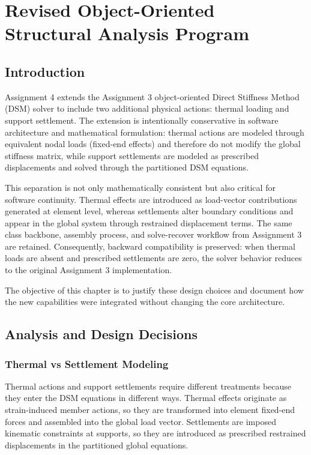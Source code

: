 \chapter{Revised Object-Oriented Structural Analysis Program}

\section{Introduction}
Assignment 4 extends the Assignment 3 object-oriented Direct Stiffness Method (DSM) solver to include two additional physical actions: thermal loading and support settlement. The extension is intentionally conservative in software architecture and mathematical formulation: thermal actions are modeled through equivalent nodal loads (fixed-end effects) and therefore do not modify the global stiffness matrix, while support settlements are modeled as prescribed displacements and solved through the partitioned DSM equations.

This separation is not only mathematically consistent but also critical for software continuity. Thermal effects are introduced as load-vector contributions generated at element level, whereas settlements alter boundary conditions and appear in the global system through restrained displacement terms. The same class backbone, assembly process, and solve-recover workflow from Assignment 3 are retained. Consequently, backward compatibility is preserved: when thermal loads are absent and prescribed settlements are zero, the solver behavior reduces to the original Assignment 3 implementation.

The objective of this chapter is to justify these design choices and document how the new capabilities were integrated without changing the core architecture.

\pagebreak
\section{Analysis and Design Decisions}

\subsection{Thermal vs Settlement Modeling}

Thermal actions and support settlements require different treatments because they enter the DSM equations in different ways. Thermal effects originate as strain-induced member actions, so they are transformed into element fixed-end forces and assembled into the global load vector. Settlements are imposed kinematic constraints at supports, so they are introduced as prescribed restrained displacements in the partitioned global equations.

